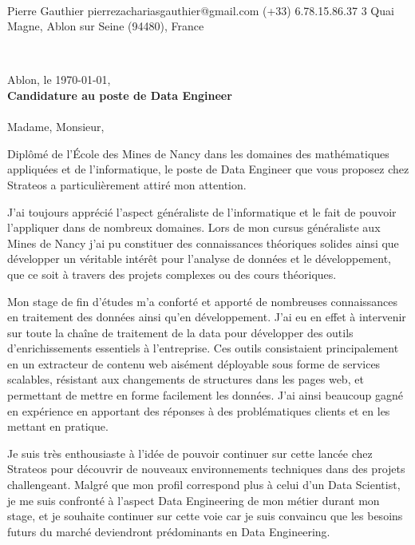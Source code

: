 \documentclass{cv_style}
\begin{document}
\vspace{3cm}\\
    {Pierre Gauthier}
    {{pierrezachariasgauthier@gmail.com}}
    {{(+33) 6.78.15.86.37}}
    {3 Quai Magne, Ablon sur Seine  (94480), France}

%
\vspace{2cm}\\
\begin{flushleft}
    \hfill Ablon, le \today, \\
    \large
    \textbf{Candidature au poste de Data Engineer  }  
    \vspace{0.2cm} \\
    \\[0.2cm]
    Madame, Monsieur,
\end{flushleft}
\vspace{0.0cm}
\large

Diplômé de l'École des Mines de Nancy dans les domaines des mathématiques appliquées et de l'informatique, le poste de Data Engineer que vous proposez chez Strateos a  particulièrement attiré mon attention. 

J'ai toujours apprécié l'aspect généraliste de l'informatique et le fait de pouvoir l'appliquer dans de nombreux domaines. Lors de mon cursus généraliste aux Mines de Nancy j'ai pu constituer des connaissances théoriques solides ainsi que développer un véritable intérêt pour l'analyse de données et le développement, que ce soit à travers des projets complexes ou des cours théoriques. 

Mon stage de fin d'études m'a conforté et apporté de nombreuses connaissances en traitement des données ainsi qu'en développement. J'ai eu en effet à intervenir sur toute la chaîne de traitement de la data pour développer des outils d'enrichissements essentiels à l'entreprise. 
Ces outils consistaient principalement en un extracteur de contenu web aisément déployable sous forme de services scalables, résistant aux changements de structures dans les pages web, et permettant de mettre en forme facilement les données. J'ai ainsi beaucoup gagné en expérience en apportant des réponses à des problématiques clients et en les mettant en pratique.  

Je suis très enthousiaste à l'idée de pouvoir continuer sur cette lancée chez Strateos pour découvrir de nouveaux environnements techniques dans des projets challengeant. Malgré que mon profil correspond plus à celui d'un Data Scientist, je me suis confronté à l'aspect Data Engineering de mon métier durant mon stage, et je souhaite continuer sur cette voie car je suis convaincu que les besoins futurs du marché deviendront prédominants en Data Engineering. 
\end{document}
